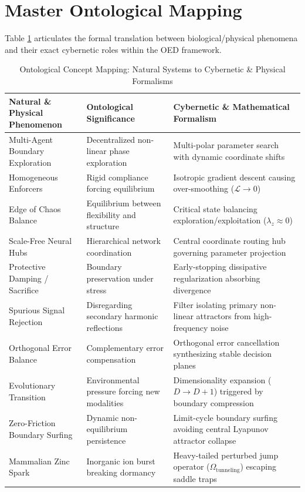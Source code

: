 \documentclass[10pt,journal,compsoc,twocolumn]{article}
\begin{document}
\section{Master Ontological Mapping}
\label{sec:atlas}
Table \ref{tab:ontology} articulates the formal translation between biological/physical phenomena and their exact cybernetic roles within the OED framework.

\begin{table}[t]
\centering
\small
\caption{Ontological Concept Mapping: Natural Systems to Cybernetic \& Physical Formalisms}
\label{tab:ontology}
\begin{tabular}{lll}
\toprule
\textbf{Natural \& Physical Phenomenon} & \textbf{Ontological Significance} & \textbf{Cybernetic \& Mathematical Formalism} \\
\midrule
Multi-Agent Boundary Exploration & Decentralized non-linear phase exploration & Multi-polar parameter search with dynamic coordinate shifts \\
Homogeneous Enforcers & Rigid compliance forcing equilibrium & Isotropic gradient descent causing over-smoothing ($\mathcal{L} \to 0$) \\
Edge of Chaos Balance & Equilibrium between flexibility and structure & Critical state balancing exploration/exploitation ($\lambda_z \approx 0$) \\
Scale-Free Neural Hubs & Hierarchical network coordination & Central coordinate routing hub governing parameter projection \\
Protective Damping / Sacrifice & Boundary preservation under stress & Early-stopping dissipative regularization absorbing divergence \\
Spurious Signal Rejection & Disregarding secondary harmonic reflections & Filter isolating primary non-linear attractors from high-frequency noise \\
Orthogonal Error Balance & Complementary error compensation & Orthogonal error cancellation synthesizing stable decision planes \\
Evolutionary Transition & Environmental pressure forcing new modalities & Dimensionality expansion ($D \to D+1$) triggered by boundary compression \\
Zero-Friction Boundary Surfing & Dynamic non-equilibrium persistence & Limit-cycle boundary surfing avoiding central Lyapunov attractor collapse \\
Mammalian Zinc Spark & Inorganic ion burst breaking dormancy & Heavy-tailed perturbed jump operator ($\Omega_{\mathrm{tunneling}}$) escaping saddle traps \\
\bottomrule
\end{tabular}
\end{table}
\end{document}
